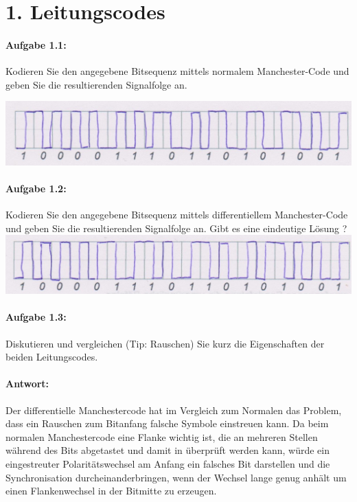 \section{1. Leitungscodes}
\paragraph{Aufgabe 1.1:}
	Kodieren Sie den angegebene Bitsequenz mittels normalem Manchester-Code und geben Sie die resultierenden Signalfolge an.

\includegraphics[scale=0.2]{blatt3_1_1}
\paragraph{Aufgabe 1.2:}
	Kodieren Sie den angegebene Bitsequenz mittels differentiellem Manchester-Code und geben Sie die resultierenden Signalfolge an. Gibt es eine eindeutige Lösung ?
\includegraphics[scale=0.2]{blatt3_1_2}

\paragraph{Aufgabe 1.3:}
	Diskutieren und vergleichen (Tip: Rauschen) Sie kurz die Eigenschaften der beiden Leitungscodes.
\paragraph{Antwort:}
    Der differentielle Manchestercode hat im Vergleich zum Normalen das Problem,
    dass ein Rauschen zum Bitanfang falsche Symbole einstreuen kann. Da beim
    normalen Manchestercode eine Flanke wichtig ist, die an mehreren Stellen
    während des Bits abgetastet und damit in überprüft werden kann, würde ein
    eingestreuter Polaritätswechsel am Anfang  ein falsches Bit darstellen und
    die Synchronisation durcheinanderbringen, wenn der Wechsel lange genug
    anhält um einen Flankenwechsel in der Bitmitte zu erzeugen.
    
